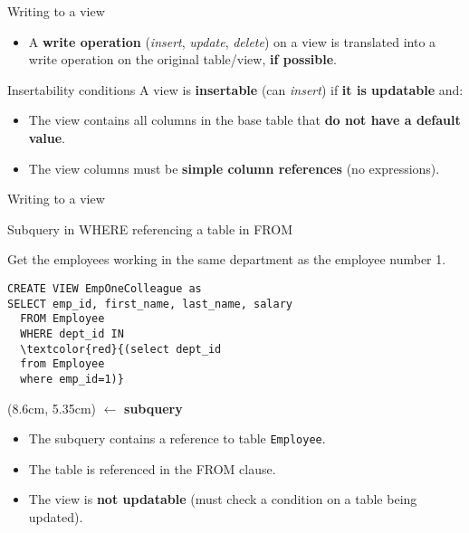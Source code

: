 \documentclass[xcolor=table]{beamer}
\begin{document}
\begin{frame}{Writing to a view}
  \begin{itemize}
    \item A {\bf write operation} ({\em insert}, {\em update}, {\em delete}) on a view
    is translated into a write operation on 
    the original table/view, {\bf if possible}.
  \end{itemize}
  \vfill
  \begin{block}{Insertability conditions}
    A view is {\bf insertable} (can {\em insert}) 
    if {\bf it is updatable} and:
    \begin{itemize}
      \item The view contains all columns in the base table that {\bf do not have a default value}.
      \item The view columns must be {\bf simple column references} (no expressions).
    \end{itemize}
  \end{block}
\end{frame}

\begin{frame}[fragile]{Writing to a view}
  \begin{block}{Subquery in WHERE referencing a table in FROM}

Get the employees working in the same department as 
the employee number 1.

\footnotesize
\begin{Verbatim}[commandchars=\\\{\}]
CREATE VIEW EmpOneColleague as
SELECT emp_id, first_name, last_name, salary
  FROM Employee
  WHERE dept_id IN 
  \textcolor{red}{(select dept_id
  from Employee
  where emp_id=1)}
\end{Verbatim}
\end{block}
\begin{textblock*}{5cm}(8.6cm, 5.35cm)
  $\longleftarrow$ {\bf subquery}
\end{textblock*}
\vfill
\begin{itemize}
  \item The subquery contains a reference to table \texttt{Employee}.
  \item The table is referenced in the FROM clause.
  \item The view is {\bf not updatable} (must check a condition on a table being updated).
\end{itemize}
\end{frame}
\end{document}
